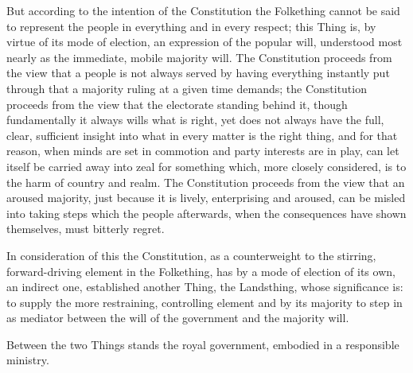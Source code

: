 \documentclass[12pt,a4paper,openany]{book}
\newcommand{\opage}[1]{\marginnote{\footnotesize\textit{[#1]}}}
\begin{document}
But according to the intention of the Constitution the Folkething cannot
be said to represent the people in everything and in every respect; this Thing is,
by virtue of its mode of election, an expression of the popular will, understood most nearly
as the immediate, mobile majority will. The Constitution
proceeds from the view that a people is not always served by
having everything instantly put through that a majority
ruling at a given time demands; the Constitution
proceeds from the view that the electorate standing behind it, though
fundamentally it always wills what is right, yet does not always have
the full, clear, sufficient insight into what in
every matter is the right thing, and for that reason, when minds
are set in commotion and party interests are in play,
can let itself be carried away into zeal for something which, more closely
considered, is to the harm of country and realm. The Constitution
proceeds from the view that an aroused majority, just because it is
lively, enterprising and aroused, can be misled into taking
steps which the people afterwards, when the consequences have shown
themselves, must bitterly regret.

In consideration of this the Constitution, as a counterweight
to the stirring, forward-driving element in the Folkething,
has by a mode of election of its own, an indirect one, established another
Thing, the Landsthing, whose significance is: to supply the
more restraining, controlling element and by its
majority to step in as mediator between the will of the government
and the majority will.

\setcounter{footnote}{0}%
\opage{8}Between the two Things stands the royal government,
embodied in a responsible ministry.
\end{document}
